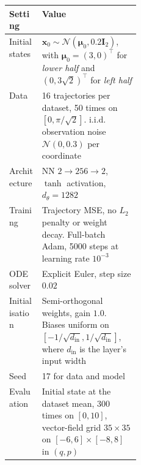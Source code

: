 \begin{tabularx}{\linewidth}{@{}p{0.25\linewidth}X@{}}
\toprule
Setting & Value \\
\midrule
Initial states
  & $\boldsymbol x_0\sim\mathcal N(\boldsymbol\mu_0,0.2\boldsymbol I_2)$,
    with $\boldsymbol\mu_0=(3,0)^\top$ for \emph{lower half}
    and $(0,3\sqrt{2})^\top$ for \emph{left half} \\
Data
  & 16 trajectories per dataset, 50 times on $[0,\pi/\sqrt{2}]$.
    i.i.d. observation noise $\mathcal N(0,0.3)$ per coordinate \\
Architecture
  & \ac{NN} $2\to256\to2$, $\tanh$ activation, $d_\theta=1282$ \\
Training
  & Trajectory \ac{MSE}, no $L_2$ penalty or weight decay.
    Full-batch Adam, 5000 steps at learning rate $10^{-3}$ \\
\Ac{ODE} solver
  & Explicit Euler, step size $0.02$ \\
Initialisation
  & Semi-orthogonal weights, gain $1.0$.
    Biases uniform on
    $[-1/\sqrt{d_{\mathrm{in}}},1/\sqrt{d_{\mathrm{in}}}]$,
    where $d_{\mathrm{in}}$ is the layer's input width \\
Seed & 17 for data and model \\
Evaluation
  & Initial state at the dataset mean, 300 times on $[0,10]$,
    vector-field grid $35\times35$ on $[-6,6]\times[-8,8]$ in $(q,p)$ \\
\bottomrule
\end{tabularx}
